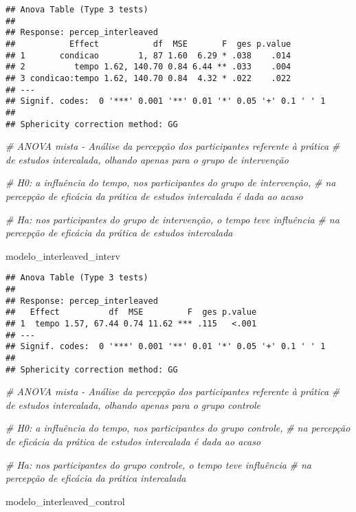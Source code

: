 \documentclass[
]{article}
\newenvironment{Shaded}{\begin{snugshade}}{\end{snugshade}}
\newcommand{\CommentTok}[1]{\textcolor[rgb]{0.56,0.35,0.01}{\textit{#1}}}
\newcommand{\NormalTok}[1]{#1}
\begin{document}
\begin{verbatim}
## Anova Table (Type 3 tests)
## 
## Response: percep_interleaved
##           Effect           df  MSE       F  ges p.value
## 1       condicao        1, 87 1.60  6.29 * .038    .014
## 2          tempo 1.62, 140.70 0.84 6.44 ** .033    .004
## 3 condicao:tempo 1.62, 140.70 0.84  4.32 * .022    .022
## ---
## Signif. codes:  0 '***' 0.001 '**' 0.01 '*' 0.05 '+' 0.1 ' ' 1
## 
## Sphericity correction method: GG
\end{verbatim}

\begin{Shaded}
\begin{Highlighting}[]
\CommentTok{\# ANOVA mista {-} Análise da percepção dos participantes referente à prática}
\CommentTok{\# de estudos intercalada, olhando apenas para o grupo de intervenção}

\CommentTok{\# H0: a influência do tempo, nos participantes do grupo de intervenção,}
\CommentTok{\# na percepção de eficácia da prática de estudos intercalada é dada ao acaso}

\CommentTok{\# Ha: nos participantes do grupo de intervenção, o tempo teve influência}
\CommentTok{\# na percepção de eficácia da prática de estudos intercalada}

\NormalTok{modelo\_interleaved\_interv}
\end{Highlighting}
\end{Shaded}

\begin{verbatim}
## Anova Table (Type 3 tests)
## 
## Response: percep_interleaved
##   Effect          df  MSE         F  ges p.value
## 1  tempo 1.57, 67.44 0.74 11.62 *** .115   <.001
## ---
## Signif. codes:  0 '***' 0.001 '**' 0.01 '*' 0.05 '+' 0.1 ' ' 1
## 
## Sphericity correction method: GG
\end{verbatim}

\begin{Shaded}
\begin{Highlighting}[]
\CommentTok{\# ANOVA mista {-} Análise da percepção dos participantes referente à prática}
\CommentTok{\# de estudos intercalada, olhando apenas para o grupo controle}


\CommentTok{\# H0: a influência do tempo, nos participantes do grupo controle,}
\CommentTok{\# na percepção de eficácia da prática de estudos intercalada é dada ao acaso}

\CommentTok{\# Ha: nos participantes do grupo controle, o tempo teve influência}
\CommentTok{\# na percepção de eficácia da prática intercalada}

\NormalTok{modelo\_interleaved\_control}
\end{Highlighting}
\end{Shaded}
\end{document}
